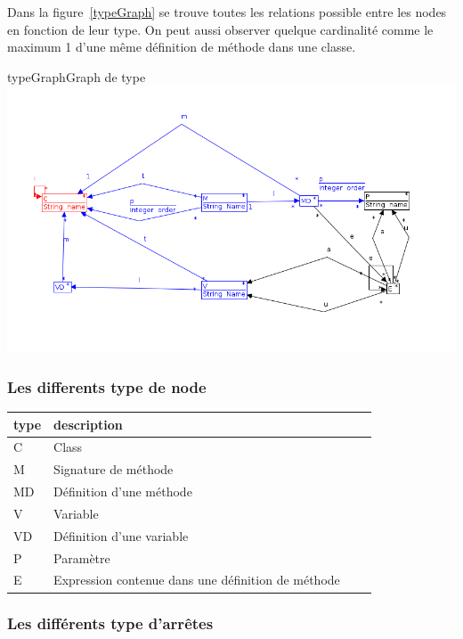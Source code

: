 \documentclass[a4paper, 12pt]{article}
\begin{document}
Dans la figure~\ref{typeGraph} se trouve toutes les relations possible entre les nodes en fonction de leur type.
On peut aussi observer quelque cardinalité comme le maximum 1 d'une même définition de méthode dans une classe.

\begin{myfig}{typeGraph}{Graph de type}
\includegraphics[width=\textwidth]{typeGraph.png}
\end{myfig}

\subsubsection{Les differents type de node}


  \begin{tabular}{ | l | l | l | p{5cm} |}
    \hline
    type & description  \\ \hline
    C & Class   \\ \hline
    M & Signature de méthode   \\ \hline
    MD &  Définition d'une méthode   \\ \hline
    V &  Variable   \\ \hline
    VD &  Définition d'une variable \\ \hline
    P & Paramètre \\ \hline
    E &  Expression contenue dans une définition de méthode \\ \hline

    \end{tabular}

\subsubsection{Les différents type d'arrêtes}
\end{document}
